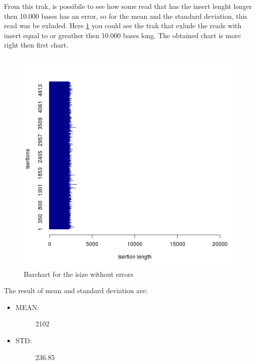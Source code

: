 From this trak, is possibile to see how some read that has the insert lenght longer then 10.000 bases has an error, so for the mean and the standard deviation, this read was be exluded.
Here \ref{fig:2} you could see the trak that exlude the reads with insert equal to or greather then 10.000 bases long. The obtained chart is more right then first chart.
 \begin{figure}[H]
				\centering
				\includegraphics[scale=0.8]{immagini/r1.png}
				\caption{Barchart for the isize without errors}\label{fig:2}
				\end{figure}

The result of mean and standard deviation are:
\begin{itemize}
\item \begin{description}
		\item[MEAN:] 2102
  \end{description}
\end{itemize}

\begin{itemize}
\item \begin{description}
		\item[STD:] 236.85
  \end{description}
\end{itemize}


